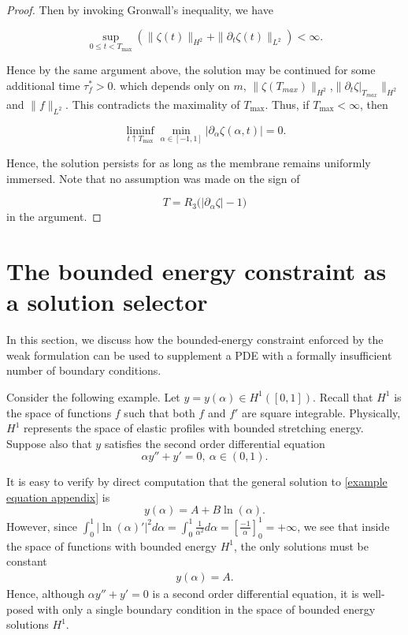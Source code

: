 \documentclass{article}[12pt]
\theoremstyle{Theorem}
\begin{document}
\begin{proof}
Then by invoking Gronwall's inequality, we have 

$$
    \sup_{0\leq t<T_{\max}}
    \left(
        \|\zeta(t)\|_{H^2}
        +\|\partial_t\zeta(t)\|_{L^2}
    \right)<\infty.
$$

Hence by the same argument above, the solution may be continued for some additional time $\tau_f^* > 0$. which depends only on $m$, $\|\zeta(T_{max})\|_{H^2}$,$\|\partial_t\zeta|_{T_{max}}\|_{H^2}$ and $\|f\|_{L^2}$. This contradicts the maximality of \(T_{\max}\). Thus, if \(T_{\max}<\infty\), then

$$
    \liminf_{t\uparrow T_{\max}}
    \min_{\alpha\in[-1,1]}
    |\partial_\alpha\zeta(\alpha,t)|=0.
$$

Hence, the solution persists for as long as the membrane remains uniformly immersed. Note that no assumption was made on the sign of

$$
    T=R_3\bigl(|\partial_\alpha\zeta|-1\bigr)
$$
in the argument.
\end{proof}



\section{The bounded energy constraint as a solution selector}
\label{missing boundary conditions appendix}
In this section, we discuss how the bounded-energy constraint enforced by the weak formulation can be used to supplement a PDE with a formally insufficient number of boundary conditions.
\newline

Consider the following example. Let $y = y(\alpha) \in H^1([0,1])$. Recall that $H^1$ is the space of functions $f$ such that both $f$ and $f'$ are square integrable. Physically, $H^1$ represents the space of elastic profiles with bounded stretching energy. Suppose also that $y$ satisfies the second order differential equation 
\begin{equation}
    \alpha y'' +y' = 0, \ \alpha\in(0,1).
    \label{example equation appendix}
\end{equation}

It is easy to verify by direct computation that the general solution to \eqref{example equation appendix} is 
\begin{equation}
    y(\alpha ) = A + B\ln(\alpha ).
\end{equation}
However, since $\int_0^1|\ln(\alpha )'|^2d\alpha = \int_0^1\frac{1}{\alpha^2}d\alpha = [\frac{-1}{\alpha}]^1_0 = +\infty $, we see that inside the space of functions with bounded energy $H^1$, the only solutions must be constant
\begin{eqnarray}
    y(\alpha ) = A.
\end{eqnarray}
Hence, although $\alpha y'' +y' = 0$ is a second order differential equation, it is well-posed with only a single boundary condition in the space of bounded energy solutions $H^1$.
\newline
\end{document}
